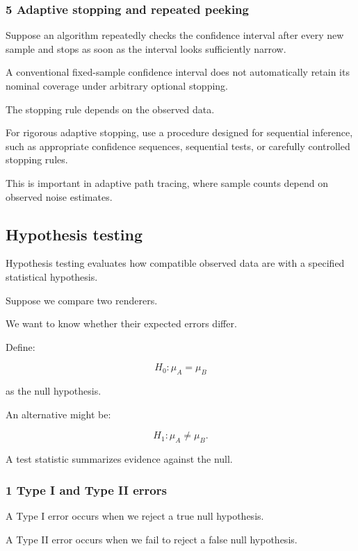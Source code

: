 \subsubsection{5 Adaptive stopping and repeated peeking}\label{02-foundations-ii-ch030-adaptive-stopping-and-repeated-peeking}

Suppose an algorithm repeatedly checks the confidence interval after every new sample and stops as soon as the interval looks sufficiently narrow.

A conventional fixed-sample confidence interval does not automatically retain its nominal coverage under arbitrary optional stopping.

The stopping rule depends on the observed data.

For rigorous adaptive stopping, use a procedure designed for sequential inference, such as appropriate confidence sequences, sequential tests, or carefully controlled stopping rules.

This is important in adaptive path tracing, where sample counts depend on observed noise estimates.

\subsection{Hypothesis testing}\label{02-foundations-ii-ch030-hypothesis-testing}

Hypothesis testing evaluates how compatible observed data are with a specified statistical hypothesis.

Suppose we compare two renderers.

We want to know whether their expected errors differ.

Define:

\[
 H_0:\mu_A=\mu_B
\]

as the null hypothesis.

An alternative might be:

\[
 H_1:\mu_A\ne\mu_B.
\]

A test statistic summarizes evidence against the null.

\subsubsection{1 Type I and Type II errors}\label{02-foundations-ii-ch030-type-i-and-type-ii-errors}

A Type I error occurs when we reject a true null hypothesis.

A Type II error occurs when we fail to reject a false null hypothesis.


